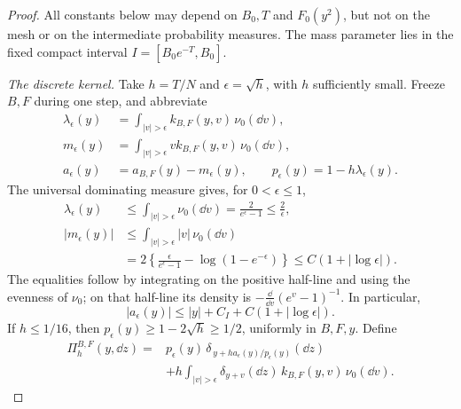 \begin{proof}
All constants below may depend on \(B_0,T\) and \(F_0(y^2)\), but not on the mesh or on the intermediate probability measures.
The mass parameter lies in the fixed compact interval \(I=[B_0e^{-T},B_0]\).

\emph{The discrete kernel.}
Take \(h=T/N\) and \(\epsilon=\sqrt h\), with \(h\) sufficiently small.
Freeze \(B,F\) during one step, and abbreviate
\begin{equation}
 \begin{split}
 \lambda_\epsilon(y)
   &=\int_{|v|>\epsilon}k_{B,F}(y,v)\,\nu_0(\dd v),\\
 m_\epsilon(y)
   &=\int_{|v|>\epsilon}v k_{B,F}(y,v)\,\nu_0(\dd v),\\
 a_\epsilon(y)&=a_{B,F}(y)-m_\epsilon(y),
 \qquad
 p_\epsilon(y)=1-h\lambda_\epsilon(y).
 \end{split}
 \label{eq:euler-truncated-coefficients}
\end{equation}
The universal dominating measure gives, for \(0<\epsilon\le1\),
\begin{equation}
 \begin{split}
 \lambda_\epsilon(y)
 &\le\int_{|v|>\epsilon}\nu_0(\dd v)
   =\frac{2}{e^\epsilon-1}\le\frac2\epsilon,\\
 |m_\epsilon(y)|
 &\le\int_{|v|>\epsilon}|v|\,\nu_0(\dd v)\\
 &=2\left\{\frac{\epsilon}{e^\epsilon-1}
                      -\log(1-e^{-\epsilon})\right\}
   \le C(1+|\log\epsilon|).
 \end{split}
 \label{eq:euler-truncation-bounds}
\end{equation}
The equalities follow by integrating on the positive half-line and using the evenness of \(\nu_0\); on that half-line its density is \(-\frac{\dd}{\dd v}(e^v-1)^{-1}\).
In particular,
\begin{equation}
 |a_\epsilon(y)|
 \le |y|+C_I+C(1+|\log\epsilon|).
 \label{eq:euler-drift-bound}
\end{equation}
If \(h\le1/16\), then \(p_\epsilon(y)\ge1-2\sqrt h\ge1/2\), uniformly in \(B,F,y\).
Define
\begin{equation}
 \begin{split}
 \Pi_h^{B,F}(y,\dd z)
 ={}&p_\epsilon(y)\,
      \delta_{\,y+h a_\epsilon(y)/p_\epsilon(y)}(\dd z)\\
 &+h\int_{|v|>\epsilon}
       \delta_{y+v}(\dd z)\,k_{B,F}(y,v)\,\nu_0(\dd v).
 \end{split}
 \label{eq:positive-euler-kernel}
\end{equation}

\end{proof}
